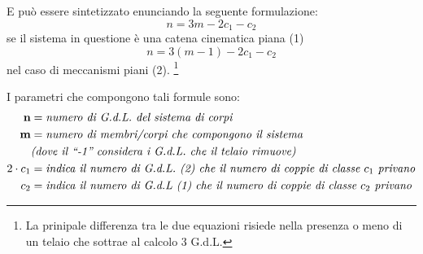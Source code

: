 \begin{enumerate}
 		E può essere sintetizzato enunciando la seguente formulazione:
 		\begin{equation}
 		n = 3m - 2c_1 - c_2
 		\end{equation}
		se il sistema in questione è una catena cinematica piana (1)
		\begin{equation}
		n = 3(m-1) -2c_1 - c_2
		\end{equation}
		nel caso di meccanismi piani (2).%
		\footnote{La prinipale differenza tra le due equazioni risiede nella presenza o meno di un telaio che sottrae al calcolo 3 G.d.L. }
	
		
		
		I parametri che compongono tali formule sono:
		\begin{equation*}
			\begin{split}
				\textbf{n} &= \emph{numero di G.d.L. del sistema di corpi}\\
				\textbf{m} &= \emph{numero di membri/corpi che compongono il sistema}\\
				&\emph{(dove il ``-1''  considera i G.d.L. che il telaio rimuove)}\\
				\textbf{$2 \cdot c_1$} &= \emph{indica il numero di G.d.L. (2) che il numero di coppie di classe $c_1$ privano}\\
				\textbf{$c_2$} &= \emph{indica il numero di G.d.L (1) che il numero di coppie di classe $c_2$ privano}
			\end{split}
		\end{equation*}
		
	\end{enumerate}
	
